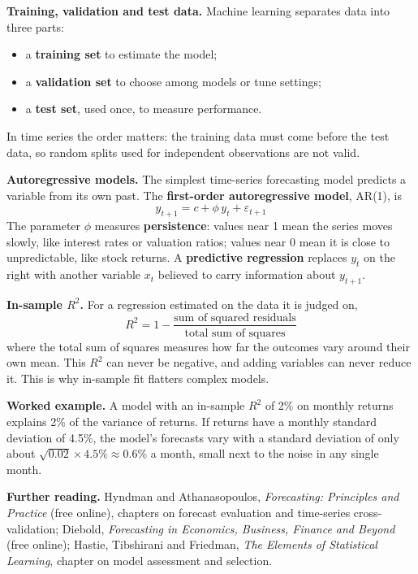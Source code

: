 \textbf{Training, validation and test data.} Machine learning separates data into three parts:

\begin{itemize}
  \item a \textbf{training set} to estimate the model;
  \item a \textbf{validation set} to choose among models or tune settings;
  \item a \textbf{test set}, used once, to measure performance.
\end{itemize}

In time series the order matters: the training data must come before the test data, so random splits used for independent observations are not valid.

\textbf{Autoregressive models.} The simplest time-series forecasting model predicts a variable from its own past. The \textbf{first-order autoregressive model}, AR(1), is
\begin{equation}
  y_{t+1} = c + \phi\,y_t + \varepsilon_{t+1}
  \label{eq:05-ar1}
\end{equation}
The parameter $\phi$ measures \textbf{persistence}: values near 1 mean the series moves slowly, like interest rates or valuation ratios; values near 0 mean it is close to unpredictable, like stock returns. A \textbf{predictive regression} replaces $y_t$ on the right with another variable $x_t$ believed to carry information about $y_{t+1}$.

\textbf{In-sample $R^2$.} For a regression estimated on the data it is judged on,
\begin{equation}
  R^2 = 1 - \frac{\text{sum of squared residuals}}{\text{total sum of squares}}
  \label{eq:05-r2}
\end{equation}
where the total sum of squares measures how far the outcomes vary around their own mean. This $R^2$ can never be negative, and adding variables can never reduce it. This is why in-sample fit flatters complex models.

\textbf{Worked example.} A model with an in-sample $R^2$ of 2\% on monthly returns explains 2\% of the variance of returns. If returns have a monthly standard deviation of 4.5\%, the model's forecasts vary with a standard deviation of only about $\sqrt{0.02} \times 4.5\% \approx 0.6\%$ a month, small next to the noise in any single month.

\textbf{Further reading.} Hyndman and Athanasopoulos, \emph{Forecasting: Principles and Practice} (free online), chapters on forecast evaluation and time-series cross-validation; Diebold, \emph{Forecasting in Economics, Business, Finance and Beyond} (free online); Hastie, Tibshirani and Friedman, \emph{The Elements of Statistical Learning}, chapter on model assessment and selection.

